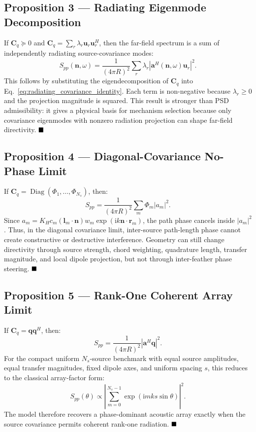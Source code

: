 \documentclass[11pt]{article}
\newcommand{\ii}{\mathrm{i}}
\newcommand{\vect}[1]{\bm{#1}}
\newcommand{\mat}[1]{\bm{#1}}
\begin{document}
\subsection{Proposition 3 --- Radiating Eigenmode Decomposition}

If $\mat{C}_q\succeq0$ and $\mat{C}_q=\sum_r\lambda_r\vect{u}_r\vect{u}_r^H$, then the far-field spectrum is a sum of independently radiating source-covariance modes:
\begin{equation*}
    S_{pp}(\vect{n},\omega)
    =
    \frac{1}{(4\pi R)^2}
    \sum_r
    \lambda_r
    \left|
        \vect{a}^H(\vect{n},\omega)\vect{u}_r
    \right|^2.
\end{equation*}
This follows by substituting the eigendecomposition of $\mat{C}_q$ into Eq.~\ref{eq:radiating_covariance_identity}. Each term is non-negative because $\lambda_r\ge0$ and the projection magnitude is squared. This result is stronger than PSD admissibility: it gives a physical basis for mechanism selection because only covariance eigenmodes with nonzero radiation projection can shape far-field directivity. $\hfill \blacksquare$

\subsection{Proposition 4 --- Diagonal-Covariance No-Phase Limit}

If $\mat{C}_q=\operatorname{Diag}(\Phi_1,\ldots,\Phi_{N_s})$, then:
\begin{equation*}
    S_{pp}
    =
    \frac{1}{(4\pi R)^2}
    \sum_m
    \Phi_m |a_m|^2.
\end{equation*}
Since $a_m=K_Hc_m(\vect{l}_m\cdot\vect{n})w_m\exp(\ii k\vect{n}\cdot\vect{r}_m)$, the path phase cancels inside $|a_m|^2$. Thus, in the diagonal covariance limit, inter-source path-length phase cannot create constructive or destructive interference. Geometry can still change directivity through source strength, chord weighting, quadrature length, transfer magnitude, and local dipole projection, but not through inter-feather phase steering. $\hfill \blacksquare$

\subsection{Proposition 5 --- Rank-One Coherent Array Limit}

If $\mat{C}_q=\vect{q}\vect{q}^{H}$, then:
\begin{equation*}
    S_{pp}
    =
    \frac{1}{(4\pi R)^2}
    \left|
        \vect{a}^{H}\vect{q}
    \right|^2.
\end{equation*}
For the compact uniform $N_s$-source benchmark with equal source amplitudes, equal transfer magnitudes, fixed dipole axes, and uniform spacing $s$, this reduces to the classical array-factor form:
\begin{equation*}
    S_{pp}(\theta)
    \propto
    \left|
        \sum_{m=0}^{N_s-1}
        \exp\left(\ii mks\sin\theta\right)
    \right|^2.
\end{equation*}
The model therefore recovers a phase-dominant acoustic array exactly when the source covariance permits coherent rank-one radiation. $\hfill \blacksquare$
\end{document}
